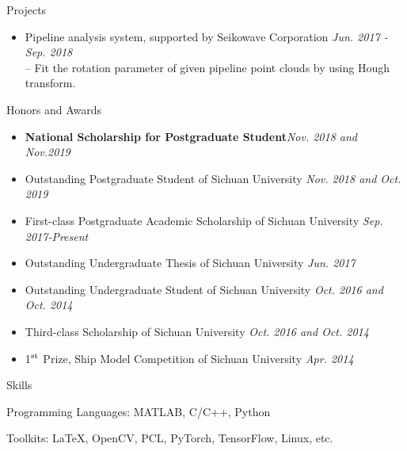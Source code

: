 \documentclass{resume} %
\begin{document}
\begin{rSection}{Projects}
\begin{itemize}[leftmargin=*]
		\item  Pipeline analysis system, supported by Seikowave Corporation 
		\hfill {\em Jun. 2017 - Sep. 2018}\vspace{1.5mm}\\		
		-- Fit the rotation parameter of given pipeline point clouds by using Hough transform.
							
	\end{itemize}
\end{rSection}

\begin{rSection}{Honors and Awards}
	\begin{itemize}[leftmargin=*]
		\item \textbf{National Scholarship for Postgraduate Student}\hfill {\em Nov. 2018 and Nov.2019}
		\item Outstanding Postgraduate Student of Sichuan University \hfill {\em Nov. 2018 and Oct. 2019} 
		\item First-class Postgraduate Academic Scholarship of Sichuan University \hfill {\em Sep. 2017-Present}
		\item Outstanding Undergraduate Thesis of Sichuan University \hfill {\em Jun. 2017}
		\item Outstanding Undergraduate Student of Sichuan University \hfill {\em Oct. 2016 and Oct. 2014} 
		\item Third-class Scholarship of Sichuan University \hfill {\em Oct. 2016 and Oct. 2014}
		\item {1$^{\rm st}$} Prize, Ship Model Competition of Sichuan University \hfill {\em Apr. 2014}
	\end{itemize}
	
\end{rSection}

\begin{rSection}{Skills}
	\item Programming Languages: MATLAB, C/C++, Python
	\item Toolkits: \LaTeX, OpenCV, PCL, PyTorch, TensorFlow, Linux, etc.
\end{rSection}
\end{document}
